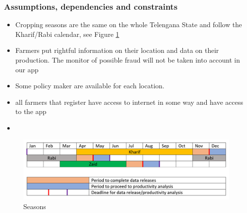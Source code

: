 \subsubsection{Assumptions, dependencies and constraints}
\begin{itemize}
	\item
	Cropping seasons are the same on the whole Telengana State and follow the Kharif/Rabi calendar, see Figure \ref{fig:seasons} %
	\item
	Farmers put rightful information on their location and data on their production. The monitor of possible fraud will not be taken into account in our app
	\item
	Some policy maker are available for each location.
	\item
	all farmers that register have access to internet in some way and have access to the app
	\item
	
\end{itemize}

\begin{figure}[H]
	
	\centering
	
	\includegraphics[width=\columnwidth]{Images/croping-seasons-calendar.png}
	
	\caption{Seasons}
	
	\label{fig:seasons}
	
\end{figure}


